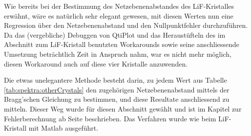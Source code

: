 Wie  bereits bei  der  Bestimmung des  Netzebenenabstandes des  LiF-Kristalles
erw\"ahnt,  w\"are es  nat\"urlich  sehr elegant  gewesen,  mit diesen  Werten
nun  eine  Regression \"uber  den  Netzebenenabstand  und den  Nullpunktfehler
durchzuf\"uhren. Da   das  (vergebliche)   Debuggen   von   QtiPlot  und   das
Heraust\"ufteln des im Abschnitt  zum LiF-Kristall benutzten Workarounds sowie
seine anschliessende  Umsetzung betr\"achtlich Zeit  in Anspruch nahm,  war es
nicht  mehr  m\"oglich,  diesen  Workaround  auch  auf  diese  vier  Kristalle
anzuwenden.

Die  etwas unelegantere  Methode  besteht  darin, zu  jedem  Wert aus  Tabelle
\ref{tab:spektra:otherCrystals}  den  zugeh\"origen Netzebenenabstand  mittels
der Bragg'schen Gleichung  zu bestimmen, und diese  Resultate anschliessend zu
mitteln. Dieser  Weg  wurde  f\"ur  diesen  Abschnitt  gew\"ahlt  und  ist  im
Kapitel  zur  Fehlerberechnung ab  Seite  \pageref{subsec:error:othercrystals}
beschrieben. Das   Verfahren   wurde   wie  beim   LiF-Kristall   mit   Matlab
ausgef\"uhrt.
